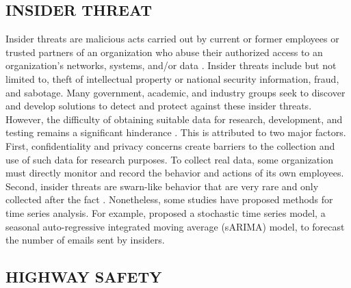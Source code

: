 \documentclass[letterpaper]{article}
\begin{document}
\subsection{INSIDER THREAT}\label{insider-threat}

Insider threats are malicious acts carried out by current or former employees or trusted partners of an organization who abuse their authorized access to an organization's networks, systems, and/or data \citep{glasser2013bridging, lindauer2014generating}. Insider threats include but not limited to, theft of intellectual property or national security information, fraud, and sabotage. Many government, academic, and industry groups seek to discover and develop solutions to detect and protect against these insider threats. However, the difficulty of obtaining suitable data for research, development, and testing remains a significant hinderance \citep{glasser2013bridging}. This is attributed to two major factors. First, confidentiality and privacy concerns create barriers to the collection and use of such data for research purposes. To collect real data, some organization must directly monitor and record the behavior and actions of its own employees. Second, insider threats are swarn-like behavior that are very rare and only collected after the fact \citep{gheyas2016detection}. Nonetheless, some studies have proposed methods for time series analysis. For example, \cite{stoffel2013finding} proposed a stochastic time series model, a seasonal auto-regressive integrated moving average (sARIMA) model, to forecast the number of emails sent by insiders.

\subsection{HIGHWAY SAFETY}\label{highway-crash-safety}
\end{document}
